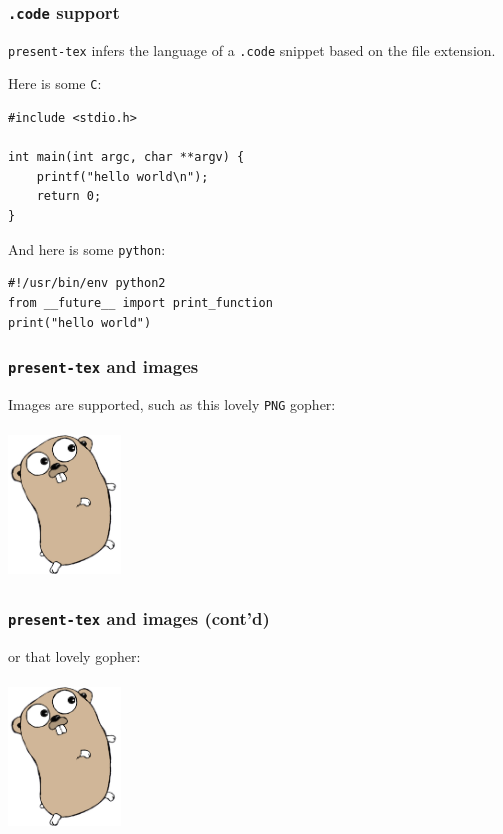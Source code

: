 \documentclass[9pt]{beamer}
\begin{document}
\begin{frame}[fragile]
\frametitle{\texttt{.code} support}



\texttt{present-tex} infers the language of a \texttt{.code} snippet based on the file extension.




Here is some \texttt{C}:



\begin{verbatim}
#include <stdio.h>

int main(int argc, char **argv) {
	printf("hello world\n");
	return 0;
}

\end{verbatim}


And here is some \texttt{python}:



\begin{verbatim}
#!/usr/bin/env python2
from __future__ import print_function
print("hello world")

\end{verbatim}


\end{frame}

\begin{frame}[fragile]
\frametitle{\texttt{present-tex} and images}



Images are supported, such as this lovely \texttt{PNG} gopher:



\begin{center}
\includegraphics[width=3cm,height=4cm]{_figs/gopher.png}
\end{center}


\end{frame}

\begin{frame}[fragile]
\frametitle{\texttt{present-tex} and images (cont'd)}



or that lovely gopher:



\begin{center}
\includegraphics[width=3cm,height=4cm]{_figs/gopher.png}
\end{center}


\end{frame}
\end{document}

